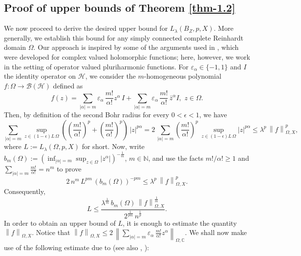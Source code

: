 \documentclass[a4paper,11pt, reqno]{amsart}
\theoremstyle{definition}
\newcommand{\norm}[1]{\left\lVert#1\right\rVert}
\begin{document}
\subsection{Proof of upper bounds of Theorem \ref{thm-1.2}} 	
	We now proceed to derive the desired upper bound for $L_{\lambda}(B_{Z}, p,X)$. More generally, we establish this bound for any simply connected complete Reinhardt domain $\Omega$. Our approach is inspired by some of the arguments used in \cite[Theorem 3.3]{defant-2004}, which were developed for complex valued holomorphic functions; here, however, we work in the setting of operator valued pluriharmonic functions.
	For $\varepsilon_{\alpha} \in \{-1,1\}$ and $I$ the identity operator on $\mathcal{H}$, we consider the $m$-homogeneous polynomial $f:\Omega \rightarrow \mathcal{B}(\mathcal{H})$ defined as 
	\begin{equation*}
		f(z)=\sum_{|\alpha|=m} \varepsilon_{\alpha}\, \frac{m!}{\alpha!}z^{\alpha}\, I +  \sum_{|\alpha|=m} \varepsilon_{\alpha}\,\frac{m!}{\alpha!}\, \bar{z}^{\alpha} I, \,\, z \in \Omega.
	\end{equation*}
	Then, by definition of the second Bohr radius for every $0<\epsilon<1$, we have
	\begin{equation*}
		\sum_{|\alpha|=m} \sup_{z \in (1-\epsilon)L\,\Omega} \left(\left(\frac{m!}{\alpha!}\right)^p+ \left(\frac{m!}{\alpha!}\right)^p\right)\, |z|^{p\alpha}  =2\, \sum_{|\alpha|=m}  \left(\frac{m!}{\alpha!}\right)^p\, \sup_{z \in (1-\epsilon)L\,\Omega} |z|^{p\alpha} \leq \lambda^p \,\norm{f}^p_{\Omega,X},
	\end{equation*}
	where $L:=L_{\lambda}(\Omega, p,X)$ for short. Now, write $b_m(\Omega):=\left(\inf_{|\alpha|=m}\sup_{z \in \Omega} |z^{\alpha}|\right)^{-\frac{1}{m}}$, $m \in \mathbb{N}$, and use the facts $m!/\alpha! \geq 1$ and $\sum_{|\alpha|=m} \frac{m!}{\alpha!}=n^m$ to prove
	\begin{equation*}
		2\, n^m \, L^{pm}\, (b_m(\Omega))^{-pm} \leq \lambda^p \,\norm{f}^p_{\Omega,X}. 
	\end{equation*}
	Consequently,
	\begin{equation} \label{snd-e-4.14}
		L \leq \frac{\lambda^{\frac{1}{m}}\,b_m(\Omega)\, \norm{f}^{\frac{1}{m}}_{\Omega,X} }{2^{\frac{1}{pm}}\, n^{\frac{1}{p}}}.
	\end{equation}
	In order to obtain an upper bound of $L$, it is enough to estimate the quantity $\norm{f}_{\Omega,X}$. Notice that $\norm{f}_{\Omega,X} \leq 2\, \norm{\sum_{|\alpha|=m} \varepsilon_{\alpha}\, \frac{m!}{\alpha!}z^{\alpha}}_{\Omega,\mathbb{C}}$. We shall now make use of the following estimate due to \cite[Theorem 2.3]{defant-2004} (see also \cite[p. 21, equ. 21]{defant-2007}, \cite[Theorem 3.1]{defant-2003}):
\end{document}
